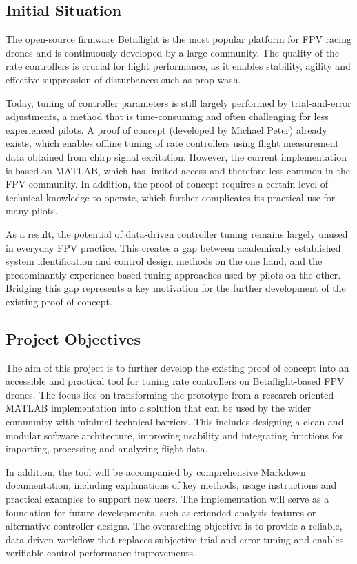 \documentclass[a4paper,11pt]{scrartcl}
\begin{document}
\subsection{Initial Situation}
The open-source firmware Betaflight is the most popular platform for FPV racing drones and is continuously developed by a large community. The quality of the rate controllers is crucial for flight performance, as it enables stability, agility and effective suppression of disturbances such as prop wash.\par
Today, tuning of controller parameters is still largely performed by trial-and-error adjustments, a method that is time-consuming and often challenging for less experienced pilots. A proof of concept (developed by Michael Peter) already exists, which enables offline tuning of rate controllers using flight measurement data obtained from chirp signal excitation. However, the current implementation is based on MATLAB, which has limited access and therefore less common in the FPV-community. In addition, the proof-of-concept requires a certain level of technical knowledge to operate, which further complicates its practical use for many pilots. \par
As a result, the potential of data-driven controller tuning remains largely unused in everyday FPV practice. This creates a gap between academically established system identification and control design methods on the one hand, and the predominantly experience-based tuning approaches used by pilots on the other. Bridging this gap represents a key motivation for the further development of the existing proof of concept.

\subsection{Project Objectives}
The aim of this project is to further develop the existing proof of concept into an accessible and practical tool for tuning rate controllers on Betaflight-based FPV drones. The focus lies on transforming the prototype from a research-oriented MATLAB implementation into a solution that can be used by the wider community with minimal technical barriers. This includes designing a clean and modular software architecture, improving usability and integrating functions for importing, processing and analyzing flight data.
\par
In addition, the tool will be accompanied by comprehensive Markdown documentation, including explanations of key methods, usage instructions and practical examples to support new users. The implementation will serve as a foundation for future developments, such as extended analysis features or alternative controller designs. The overarching objective is to provide a reliable, data-driven workflow that replaces subjective trial-and-error tuning and enables verifiable control performance improvements.
\end{document}

